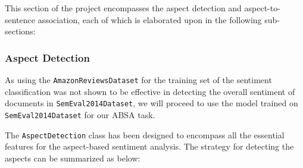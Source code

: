 This section of the project encompasses the aspect detection and aspect-to-sentence association, each of which is elaborated upon in the following sub-sections:

\subsubsection{Aspect Detection}\label{sec:aspect_detection}

As using the \texttt{AmazonReviewsDataset} for the training set of the sentiment classification was not shown to be effective in detecting the overall sentiment of documents in \texttt{SemEval2014Dataset}, we will proceed to use the model trained on \texttt{SemEval2014Dataset} for our ABSA task.

The \texttt{AspectDetection} class has been designed to encompass all the essential features for the aspect-based sentiment analysis. The strategy for detecting the aspects can be summarized as below:

